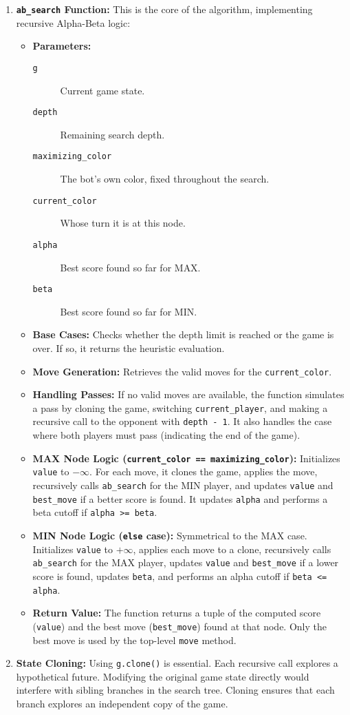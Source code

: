 \documentclass[11pt]{article}
\begin{document}
\begin{enumerate}
    \item \textbf{\texttt{ab\_search} Function:} This is the core of the algorithm, implementing recursive Alpha-Beta logic:
    \begin{itemize}
        \item \textbf{Parameters:} 
        \begin{description}
		  \item[\texttt{g}] Current game state.
		  \item[\texttt{depth}] Remaining search depth.
		  \item[\texttt{maximizing\_color}] The bot's own color, fixed throughout the search.
		  \item[\texttt{current\_color}] Whose turn it is at this node.
		  \item[\texttt{alpha}] Best score found so far for MAX.
		  \item[\texttt{beta}] Best score found so far for MIN.
	\end{description}
        \item \textbf{Base Cases:} Checks whether the depth limit is reached or the game is over. If so, it returns the heuristic evaluation.
        \item \textbf{Move Generation:} Retrieves the valid moves for the \texttt{current\_color}.
        \item \textbf{Handling Passes:} If no valid moves are available, the function simulates a pass by cloning the game, switching \texttt{current\_player}, and making a recursive call to the opponent with \texttt{depth - 1}. It also handles the case where both players must pass (indicating the end of the game).
        \item \textbf{MAX Node Logic (\texttt{current\_color == maximizing\_color}):} Initializes \texttt{value} to $-\infty$. For each move, it clones the game, applies the move, recursively calls \texttt{ab\_search} for the MIN player, and updates \texttt{value} and \texttt{best\_move} if a better score is found. It updates \texttt{alpha} and performs a beta cutoff if \texttt{alpha >= beta}.
        \item \textbf{MIN Node Logic (\texttt{else} case):} Symmetrical to the MAX case. Initializes \texttt{value} to $+\infty$, applies each move to a clone, recursively calls \texttt{ab\_search} for the MAX player, updates \texttt{value} and \texttt{best\_move} if a lower score is found, updates \texttt{beta}, and performs an alpha cutoff if \texttt{beta <= alpha}.
        \item \textbf{Return Value:} The function returns a tuple of the computed score (\texttt{value}) and the best move (\texttt{best\_move}) found at that node. Only the best move is used by the top-level \texttt{move} method.
    \end{itemize}

    \item \textbf{State Cloning:} Using \texttt{g.clone()} is essential. Each recursive call explores a hypothetical future. Modifying the original game state directly would interfere with sibling branches in the search tree. Cloning ensures that each branch explores an independent copy of the game.
\end{enumerate}
\end{document}
